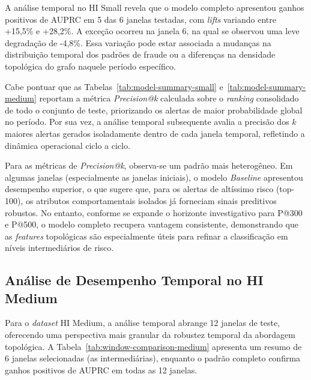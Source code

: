 \documentclass[a4paper,12pt,oneside,onecolumn,final,fleqn]{repUERJ}
\begin{document}
A análise temporal no HI Small revela que o modelo completo apresentou ganhos positivos de AUPRC em 5 das 6 janelas testadas, com \textit{lifts} variando entre +15,5\% e +28,2\%. A exceção ocorreu na janela 6, na qual se observou uma leve degradação de -4,8\%. Essa variação pode estar associada a mudanças na distribuição temporal dos padrões de fraude ou a diferenças na densidade topológica do grafo naquele período específico.

Cabe pontuar que as Tabelas~\ref{tab:model-summary-small} e~\ref{tab:model-summary-medium} reportam a métrica \textit{Precision@k} calculada sobre o \textit{ranking} consolidado de todo o conjunto de teste, priorizando os alertas de maior probabilidade global no período. Por sua vez, a análise temporal subsequente avalia a precisão dos $k$ maiores alertas gerados isoladamente dentro de cada janela temporal, refletindo a dinâmica operacional ciclo a ciclo.

Para as métricas de \textit{Precision@k}, observa-se um padrão mais heterogêneo. Em algumas janelas (especialmente as janelas iniciais), o modelo \textit{Baseline} apresentou desempenho superior, o que sugere que, para os alertas de altíssimo risco (top-100), os atributos comportamentais isolados já forneciam sinais preditivos robustos. No entanto, conforme se expande o horizonte investigativo para P@300 e P@500, o modelo completo recupera vantagem consistente, demonstrando que as \textit{features} topológicas são especialmente úteis para refinar a classificação em níveis intermediários de risco.

\subsection{Análise de Desempenho Temporal no HI Medium}

Para o \textit{dataset} HI Medium, a análise temporal abrange 12 janelas de teste, oferecendo uma perspectiva mais granular da robustez temporal da abordagem topológica. A Tabela~\ref{tab:window-comparison-medium} apresenta um resumo de 6 janelas selecionadas (as intermediárias), enquanto o padrão completo confirma ganhos positivos de AUPRC em todas as 12 janelas.
\end{document}
